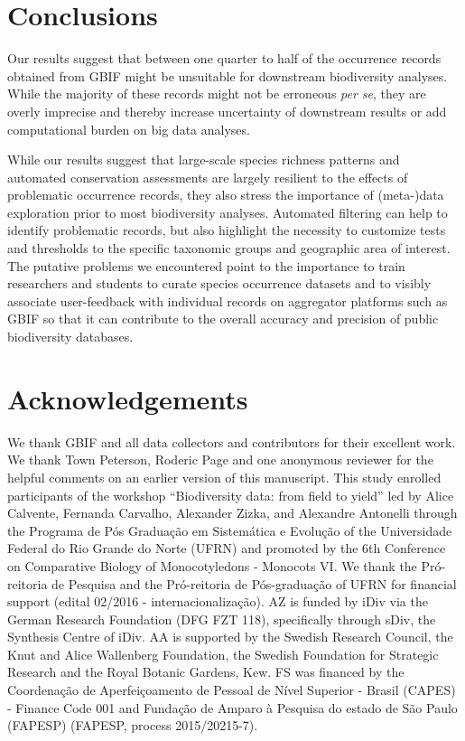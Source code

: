 \documentclass[fleqn,10pt,lineno]{wlpeerj} %
\begin{document}
\hypertarget{conclusions}{%
\section*{Conclusions}\label{conclusions}}

Our results suggest that between one quarter to half of the occurrence records obtained from GBIF might be unsuitable for downstream biodiversity analyses. While the majority of these records might not be erroneous \emph{per se}, they are overly imprecise and thereby increase uncertainty of downstream results or add computational burden on big data analyses.

While our results suggest that large-scale species richness patterns and automated conservation assessments are largely resilient to the effects of problematic occurrence records, they also stress the importance of (meta-)data exploration prior to most biodiversity analyses. Automated filtering can help to identify problematic records, but also highlight the necessity to customize tests and thresholds to the specific taxonomic groups and geographic area of interest. The putative problems we encountered point to the importance to train researchers and students to curate species occurrence datasets and to visibly associate user-feedback with individual records on aggregator platforms such as GBIF so that it can contribute to the overall accuracy and precision of public biodiversity databases.

\hypertarget{acknowledgements}{%
\section*{Acknowledgements}\label{acknowledgements}}

We thank GBIF and all data collectors and contributors for their excellent work. We thank Town Peterson, Roderic Page and one anonymous reviewer for the helpful comments on an earlier version of this manuscript. This study enrolled participants of the workshop ``Biodiversity data: from field to yield'' led by Alice Calvente, Fernanda Carvalho, Alexander Zizka, and Alexandre Antonelli through the Programa de Pós Graduação em Sistemática e Evolução of the Universidade Federal do Rio Grande do Norte (UFRN) and promoted by the 6th Conference on Comparative Biology of Monocotyledons - Monocots VI. We thank the Pró-reitoria de Pesquisa and the Pró-reitoria de Pós-graduação of UFRN for financial support (edital 02/2016 - internacionalização). AZ is funded by iDiv via the German Research Foundation (DFG FZT 118), specifically through sDiv, the Synthesis Centre of iDiv. AA is supported by the Swedish Research Council, the Knut and Alice Wallenberg Foundation, the Swedish Foundation for Strategic Research and the Royal Botanic Gardens, Kew. FS was financed by the Coordenação de Aperfeiçoamento de Pessoal de Nível Superior - Brasil (CAPES) - Finance Code 001 and Fundação de Amparo à Pesquisa do estado de São Paulo (FAPESP) (FAPESP, process 2015/20215-7).
\end{document}
